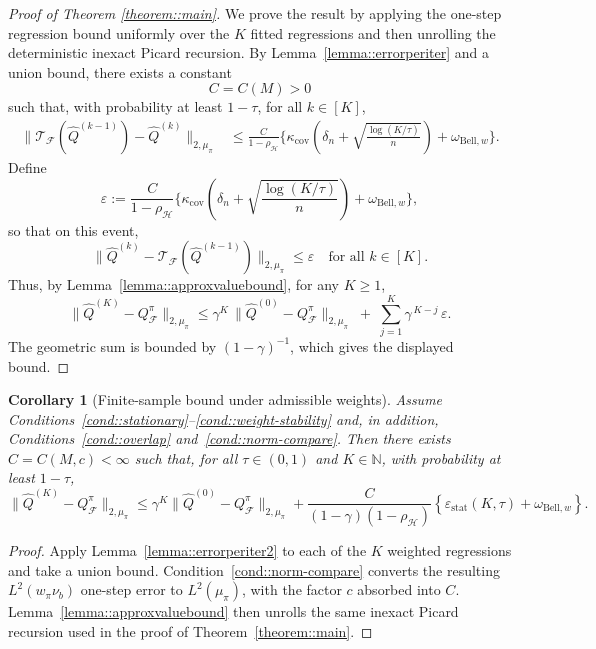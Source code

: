 \documentclass{article}
\theoremstyle{plain}
\newtheorem{corollary}{Corollary}
\theoremstyle{definition}
\theoremstyle{remark}
\begin{document}
\begin{proof}[Proof of Theorem \ref{theorem::main}]
We prove the result by applying the one-step regression bound uniformly over
the \(K\) fitted regressions and then unrolling the deterministic inexact
Picard recursion. By Lemma~\ref{lemma::errorperiter} and a union bound, there
exists a constant
\[
C=C(M)>0
\]
such that, with
probability at least \(1-\tau\), for all \(k\in[K]\),
\[
\begin{aligned}
\|\mathcal{T}_{\mathcal{F}}(\hat{Q}^{(k-1)}) - \hat{Q}^{(k)}\|_{2,{\mu_\pi}}
&\le
\frac{C}{1-\rho_{\mathcal H}}\Biggl\{
\kappa_{\mathrm{cov}}
\left(
\delta_n+\sqrt{\frac{\log(K/\tau)}{n}}
\right)
+
\omega_{\mathrm{Bell},w}
\Biggr\}.
\end{aligned}
\]
Define
\[
\varepsilon
:=
\frac{C}{1-\rho_{\mathcal H}}\Biggl\{
\kappa_{\mathrm{cov}}
\left(
\delta_n+\sqrt{\frac{\log(K/\tau)}{n}}
\right)
+
\omega_{\mathrm{Bell},w}
\Biggr\},
\]
so that on this event,
\[
\|\hat{Q}^{(k)} - \mathcal{T}_{\mathcal{F}}(\hat{Q}^{(k-1)})\|_{2,{\mu_\pi}}
\le \varepsilon
\quad\text{for all } k \in [K].
\]
Thus, by Lemma~\ref{lemma::approxvaluebound}, for any $K \ge 1$,
\[
\|\hat{Q}^{(K)} - Q^\pi_{\mathcal{F}}\|_{2,{\mu_\pi}}
\le
\gamma^K\,\|\hat{Q}^{(0)} - Q^\pi_{\mathcal{F}}\|_{2,{\mu_\pi}}
\;+\;
\sum_{j=1}^K \gamma^{\,K-j}\,\varepsilon.
\]
The geometric sum is bounded by \((1-\gamma)^{-1}\), which gives the displayed
bound.
\end{proof}

\begin{corollary}[Finite-sample bound under admissible weights]
\label{cor:admissible-fqe-bound}
Assume Conditions~\ref{cond::stationary}--\ref{cond::weight-stability} and,
in addition, Conditions~\ref{cond::overlap} and~\ref{cond::norm-compare}. Then
there exists \(C=C(M,c)<\infty\) such that, for all \(\tau\in(0,1)\) and
\(K\in\mathbb N\), with probability at least \(1-\tau\),
\[
\|\widehat Q^{(K)}-Q^\pi_{\mathcal F}\|_{2,\mu_\pi}
\le
\gamma^K\|\widehat Q^{(0)}-Q^\pi_{\mathcal F}\|_{2,\mu_\pi}
+
\frac{C}{(1-\gamma)(1-\rho_{\mathcal H})}
\left\{
\varepsilon_{\mathrm{stat}}(K,\tau)
+\omega_{\mathrm{Bell},w}
\right\}.
\]
\end{corollary}

\begin{proof}
Apply Lemma~\ref{lemma::errorperiter2} to each of the \(K\) weighted
regressions and take a union bound. Condition~\ref{cond::norm-compare} converts
the resulting \(L^2(w_\pi\nu_b)\) one-step error to \(L^2(\mu_\pi)\), with the
factor \(c\) absorbed into \(C\). Lemma~\ref{lemma::approxvaluebound} then
unrolls the same inexact Picard recursion used in the proof of
Theorem~\ref{theorem::main}.
\end{proof}
\end{document}
